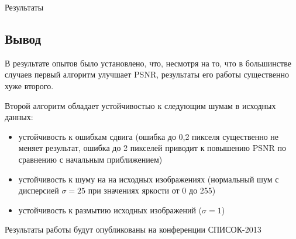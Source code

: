 \begin{frame}{Результаты}
\subsection{Вывод} В результате опытов было установлено, что, несмотря на то, что в большинстве случаев первый алгоритм
улучшает PSNR, результаты его работы существенно хуже второго.

Второй алгоритм обладает устойчивостью к следующим шумам в исходных данных:
\begin{itemize}
  \item устойчивость к ошибкам сдвига (ошибка до 0,2 пикселя существенно не меняет результат, ошибка до 2 пикселей
    приводит к повышению PSNR по сравнению с начальным приближением)
  \item устойчивость к шуму на на исходных изображениях (нормальный шум с дисперсией $\sigma=25$ при значениях яркости
    от 0 до 255)
  \item устойчивость к размытию исходных изображений ($\sigma = 1$)
\end{itemize}
Результаты работы будут опубликованы на конференции СПИСОК-2013
\end{frame}
